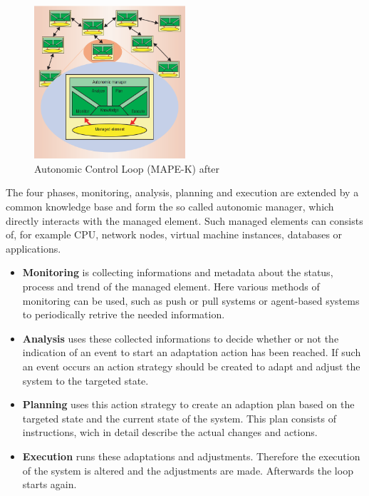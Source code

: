 \begin{figure}[ht]
\begin{center}
\includegraphics[width=0.5\textwidth]{chapters/chapter4/fig/mape2.png}
\end{center}
\caption{Autonomic Control Loop (MAPE-K) after \cite{kephart2003vision}}
\label{fig:SLA_Structure}
\end{figure}

The four phases, monitoring, analysis, planning and execution are extended by a common knowledge base and form the so called autonomic manager, which directly interacts with the managed element. Such managed elements can consists of, for example CPU, network nodes, virtual machine instances, databases or applications. 

\begin{itemize} 
\item \textbf{Monitoring} is collecting informations and metadata about the status, process and trend of the managed element. Here 
various methods of monitoring can be used, such as push or pull systems or agent-based systems to periodically retrive the needed information.  
\item \textbf{Analysis} uses these collected informations to decide whether or not the indication of an event to start an adaptation action has been reached. If such an event occurs an action strategy should be created to adapt and adjust the system to the targeted state.
\item \textbf{Planning} uses this action strategy to create an adaption plan based on the targeted state and the current state of the system. This plan consists of instructions, wich in detail describe the actual changes and actions.
\item \textbf{Execution} runs these adaptations and adjustments. Therefore the execution of the system is altered and the adjustments are made. Afterwards the loop starts again.
\end{itemize} 

